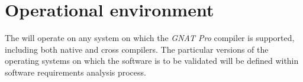 \section{Operational environment}

The \ssat{} will operate on any system on which the \emph{GNAT Pro}
compiler is supported, including both native and cross compilers. The
particular versions of the operating systems on which the software is
to be validated will be defined within software requirements analysis
process.
